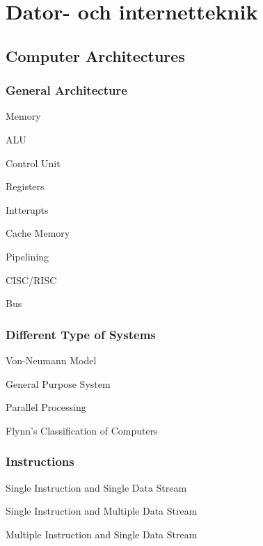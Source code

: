 \documentclass[11pt]{article}
\begin{document}
\section{Dator- och internetteknik}

\subsection{Computer Architectures}

\subsubsection{General Architecture}

Memory

ALU

Control Unit

Registers

Intterupts

Cache Memory

Pipelining

CISC/RISC

Bus

\subsubsection{Different Type of Systems}

Von-Neumann Model

General Purpose System

Parallel Processing

Flynn's Classification of Computers

\subsubsection{Instructions}

Single Instruction and Single Data Stream

Single Instruction and Multiple Data Stream

Multiple Instruction and Single Data Stream
\end{document}
